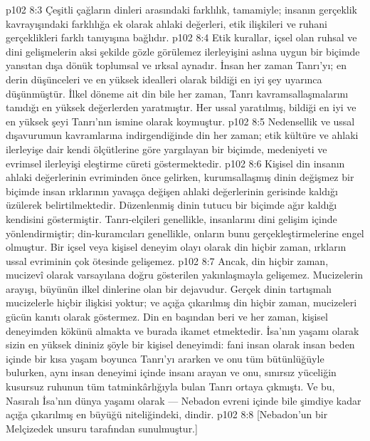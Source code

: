 \vs p102 8:3 Çeşitli çağların dinleri arasındaki farklılık, tamamiyle; insanın gerçeklik kavrayışındaki farklılığa ek olarak ahlaki değerleri, etik ilişkileri ve ruhani gerçeklikleri farklı tanıyışına bağlıdır.
\vs p102 8:4 Etik kurallar, içsel olan ruhsal ve dini gelişmelerin aksi şekilde gözle görülemez ilerleyişini aslına uygun bir biçimde yansıtan dışa dönük toplumsal ve ırksal aynadır. İnsan her zaman Tanrı’yı; en derin düşünceleri ve en yüksek idealleri olarak bildiği en iyi şey uyarınca düşünmüştür. İlkel döneme ait din bile her zaman, Tanrı kavramsallaşmalarını tanıdığı en yüksek değerlerden yaratmıştır. Her ussal yaratılmış, bildiği en iyi ve en yüksek şeyi Tanrı’nın ismine olarak koymuştur.
\vs p102 8:5 Nedensellik ve ussal dışavurumun kavramlarına indirgendiğinde din her zaman; etik kültüre ve ahlaki ilerleyişe dair kendi ölçütlerine göre yargılayan bir biçimde, medeniyeti ve evrimsel ilerleyişi eleştirme cüreti göstermektedir.
\vs p102 8:6 Kişisel din insanın ahlaki değerlerinin evriminden önce gelirken, kurumsallaşmış dinin değişmez bir biçimde insan ırklarının yavaşça değişen ahlaki değerlerinin gerisinde kaldığı üzülerek belirtilmektedir. Düzenlenmiş dinin tutucu bir biçimde ağır kaldığı kendisini göstermiştir. Tanrı\hyp{}elçileri genellikle, insanlarını dini gelişim içinde yönlendirmiştir; din\hyp{}kuramcıları genellikle, onların bunu gerçekleştirmelerine engel olmuştur. Bir içsel veya kişisel deneyim olayı olarak din hiçbir zaman, ırkların ussal evriminin çok ötesinde gelişemez.
\vs p102 8:7 Ancak, din hiçbir zaman, mucizevî olarak varsayılana doğru gösterilen yakınlaşmayla gelişemez. Mucizelerin arayışı, büyünün ilkel dinlerine olan bir dejavudur. Gerçek dinin tartışmalı mucizelerle hiçbir ilişkisi yoktur; ve açığa çıkarılmış din hiçbir zaman, mucizeleri gücün kanıtı olarak göstermez. Din en başından beri ve her zaman, kişisel deneyimden kökünü almakta ve burada ikamet etmektedir. İsa’nın yaşamı olarak sizin en yüksek dininiz şöyle bir kişisel deneyimdi: fani insan olarak insan beden içinde bir kısa yaşam boyunca Tanrı’yı ararken ve onu tüm bütünlüğüyle bulurken, aynı insan deneyimi içinde insanı arayan ve onu, sınırsız yüceliğin kusursuz ruhunun tüm tatminkârlığıyla bulan Tanrı ortaya çıkmıştı. Ve bu, Nasıralı İsa’nın dünya yaşamı olarak --- Nebadon evreni içinde bile şimdiye kadar açığa çıkarılmış en büyüğü niteliğindeki, dindir.
\vs p102 8:8 [Nebadon’un bir Melçizedek unsuru tarafından sunulmuştur.]
